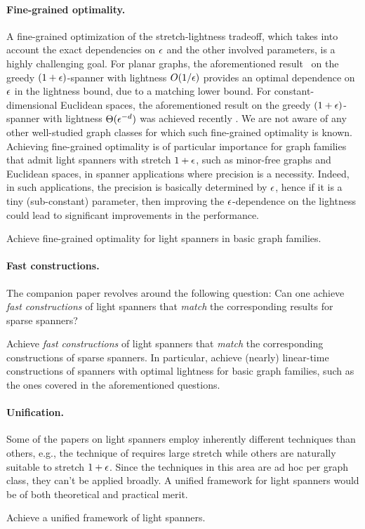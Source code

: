 \paragraph{Fine-grained optimality.~}  A fine-grained optimization of the stretch-lightness tradeoff, which takes into account the exact dependencies on $\epsilon$ and the other involved parameters, is a highly challenging goal. For planar graphs, the aforementioned result~\cite{ADDJS93} on the greedy $(1+\epsilon)$-spanner with lightness $O(1/\epsilon)$ provides an optimal dependence on $\epsilon$ in the lightness bound, due to a matching lower bound.
For constant-dimensional Euclidean spaces, the aforementioned result on the greedy $(1+\epsilon)$-spanner with lightness $\Theta(\epsilon^{-d})$ was achieved recently \cite{LS19}. We are not aware of any other well-studied graph classes for which such fine-grained optimality is known. 
Achieving fine-grained optimality is of particular importance for graph families that admit light spanners with stretch $1+\epsilon$, such as minor-free graphs and Euclidean spaces, in spanner applications where precision is a necessity. Indeed, in such applications, the precision is basically determined by $\epsilon$, hence if it is a tiny (sub-constant) parameter, then improving the $\epsilon$-dependence on the lightness could lead to significant improvements in the performance.

\begin{goal} \label{g2}
Achieve fine-grained optimality for light spanners in basic graph families. 
\end{goal}

\paragraph{Fast constructions.~}
The companion paper revolves around the following question: Can one achieve {\em fast constructions} of light spanners that {\em match} the corresponding results for sparse spanners? 

\begin{goal} \label{g1}
Achieve {\em fast constructions} of light spanners that {\em match} the corresponding constructions of sparse spanners. 
In particular, achieve (nearly) linear-time constructions of spanners with optimal lightness for basic graph families, such as the ones covered in the aforementioned questions. 
\end{goal}

\paragraph{Unification.~}
Some of the papers on light spanners employ inherently different techniques than others, e.g., the technique of \cite{CW16} requires large stretch while others are naturally suitable to stretch $1+\epsilon$.
Since the techniques in this area are ad hoc per graph class, they can't be applied broadly.
A unified framework for light spanners would be of both theoretical and practical merit.
\begin{goal} \label{g3}
Achieve a unified framework of light spanners.
\end{goal}


